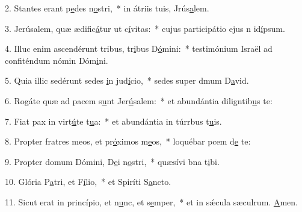 2. Stantes erant p\uline{e}des n\uline{o}stri,~* in átriis tuis, Jrús\uline{a}lem.\par 
3. Jerúsalem, quæ ædific\uline{á}tur ut c\uline{í}vitas:~* cujus participátio ejus n id\uline{í}psum.\par 
4. Illuc enim ascendérunt tribus, tr\uline{i}bus D\uline{ó}mini:~* testimónium Israël ad confiténdum nómin Dóm\uline{i}ni.\par 
5. Quia illic sedérunt sedes \uline{i}n jud\uline{í}cio,~* sedes super dmum D\uline{a}vid.\par 
6. Rogáte quæ ad pacem s\uline{u}nt Jer\uline{ú}salem:~* et abundántia diligntib\uline{u}s te:\par 
7. Fiat pax in virt\uline{ú}te t\uline{u}a:~* et abundántia in túrrbus t\uline{u}is.\par 
8. Propter fratres meos, et pr\uline{ó}ximos m\uline{e}os,~* loquébar pcem d\uline{e} te:\par 
9. Propter domum Dómini, D\uline{e}i n\uline{o}stri,~* quæsívi bna t\uline{i}bi.\par 
10. Glória P\uline{a}tri, et F\uline{í}lio,~* et Spiríti S\uline{a}ncto.\par 
11. Sicut erat in princípio, et n\uline{u}nc, et s\uline{e}mper,~* et in sǽcula sæculrum. \uline{A}men.\par 
